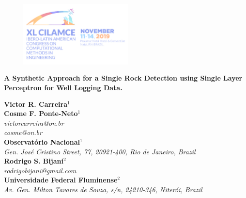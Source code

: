 \documentclass{cilamce19}
\begin{document}


 
\begin{titlepage}
	

	
	\begin{figure}
	\flushright
	\includegraphics[width=2.25in]{clm19_lb.png}
    \end{figure}


 \begin{center}
 	\begin{title}
 		\centering
 		\textbf{A Synthetic Approach for a Single Rock Detection using Single Layer Perceptron for Well Logging Data.}
 	\end{title}	
 \end{center}



\noindent
\textbf{Victor R. Carreira$^{1}$}
\\
\textbf{Cosme F. Ponte-Neto$^{1}$}
\\
\textit{victorcarreira@on.br}\\
\textit{cosme@on.br}
\\
\textbf{Observat\'orio Nacional$^{1}$}
\\
\textit{Gen. Jos\'e Cristino Street, 77, 20921-400, Rio de Janeiro, Brazil}
\\
\textbf{Rodrigo S. Bijani$^{2}$}
\\
\textit{rodrigobijani@gmail.com}\\
\textbf{Universidade Federal Fluminense$^{2}$}
\\
\textit{Av. Gen. Milton Tavares de Souza, s/n, 24210-346, Niter\'oi, Brazil}
\\


\end{titlepage}
\end{document}
